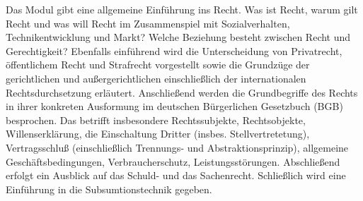 \begin{module}
\begin{content}
Das Modul gibt eine allgemeine Einführung ins Recht. Was ist Recht, warum gilt Recht und was will Recht im Zusammenspiel mit Sozialverhalten, Technikentwicklung und Markt? Welche Beziehung besteht zwischen Recht und Gerechtigkeit? Ebenfalls einführend wird die Unterscheidung von Privatrecht, öffentlichem Recht und Strafrecht vorgestellt sowie die Grundzüge der gerichtlichen und außergerichtlichen einschließlich der internationalen Rechtsdurchsetzung erläutert. Anschließend werden die Grundbegriffe des Rechts in ihrer konkreten Ausformung im deutschen Bürgerlichen Gesetzbuch (BGB) besprochen. Das betrifft insbesondere Rechtssubjekte, Rechtsobjekte, Willenserklärung, die Einschaltung Dritter (insbes. Stellvertretetung), Vertragsschluß (einschließlich Trennungs- und Abstraktionsprinzip), allgemeine Geschäftsbedingungen, Verbraucherschutz, Leistungsstörungen. Abschließend erfolgt ein Ausblick auf das Schuld- und das Sachenrecht. Schließlich wird eine Einführung in die Subsumtionstechnik gegeben.


\end{content}



\end{module}

